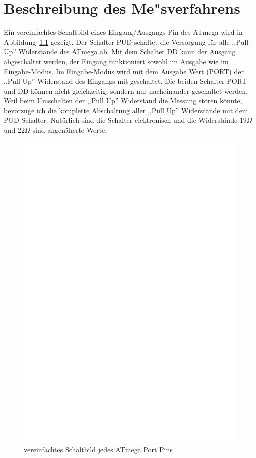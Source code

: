 \chapter{Beschreibung des Me"sverfahrens}
Ein vereinfachtes Schaltbild eines Eingang/Ausgangs-Pin des ATmega wird in Abbildung~\ref{fig:port} gezeigt.
Der Schalter PUD schaltet die Versorgung f\"ur alle ,,Pull Up'' Widerst\"ande des ATmega ab.
Mit dem Schalter DD kann der Ausgang abgeschaltet werden, der Eingang funktioniert sowohl im Ausgabe wie im
Eingabe-Modus. Im Eingabe-Modus wird mit dem Ausgabe Wert (PORT) der ,,Pull Up'' Widerstand des Eingangs mit geschaltet.
Die beiden Schalter PORT und DD k\"onnen nicht gleichzeitig, sondern nur nacheinander geschaltet werden.
Weil beim Umschalten der ,,Pull Up'' Widerstand die Messung st\"oren k\"onnte, bevorzuge ich die komplette
Abschaltung aller ,,Pull Up'' Widerst\"ande mit dem PUD Schalter.
Nat\"urlich sind die Schalter elektronisch und die Widerst\"ande \(19\Omega\) und \(22\Omega\) sind angen\"aherte Werte.
\begin{figure}[H]
\centering
\includegraphics[]{../FIG/port.eps}
\caption{vereinfachtes Schaltbild jedes ATmega Port Pins}
\label{fig:port}
\end{figure}

